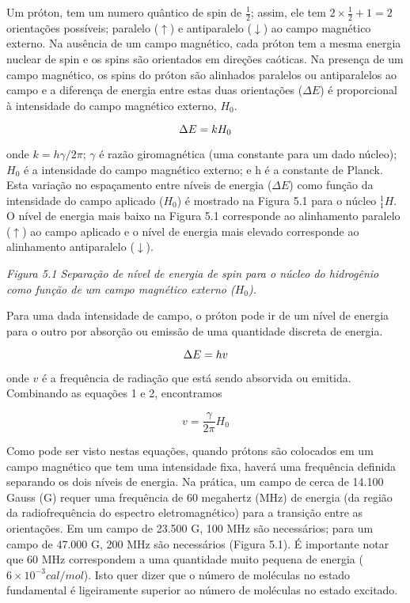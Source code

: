 Um próton,  tem um numero quântico de spin de $\frac{1}{2}$; assim, ele tem $2\times\frac{1}{2}+1=2$ orientações possíveis; paralelo ($\uparrow$) e antiparalelo ($\downarrow$) ao campo magnético externo. Na ausência de um campo magnético, cada próton tem a mesma energia nuclear de spin e os spins são orientados em direções caóticas. Na presença de um campo magnético, os spins do próton são alinhados paralelos ou antiparalelos ao campo e a diferença de energia entre estas duas orientações ($\Delta E$) é proporcional à intensidade do campo magnético externo, $H_0$.

\begin{equation}
    \centering
    \Delta E = k H_0
\end{equation}

\noindent onde $k = h\gamma/2\pi$; $\gamma$ é razão giromagnética (uma constante para um dado núcleo); $H_0$ é a intensidade do campo magnético externo; e h é a constante de Planck. Esta variação no espaçamento entre níveis de energia ($\Delta E$) como função da intensidade do campo aplicado ($H_0$) é mostrado na Figura 5.1 para o núcleo $^1_1H$. O nível de energia mais baixo na Figura 5.1 corresponde ao alinhamento paralelo ($\uparrow$) ao campo aplicado e o nível de energia mais elevado corresponde ao alinhamento antiparalelo ($\downarrow$).

\emph{Figura 5.1 Separação de nível de energia de spin para o núcleo do hidrogênio como função de um campo magnético externo ($H_0$).}

Para uma dada intensidade de campo, o próton pode ir de um nível de energia para o outro por absorção ou emissão de uma quantidade discreta de energia.

\begin{equation}
    \centering
    \Delta E = hv
\end{equation}

onde $v$ é a frequência de radiação que está sendo absorvida ou emitida. Combinando as equações 1 e 2, encontramos

\begin{equation}
v = \frac{\gamma}{2\pi} H_0
\end{equation}

Como pode ser visto nestas equações, quando prótons são colocados em um campo magnético que tem uma intensidade fixa, haverá uma frequência definida separando os dois níveis de energia. Na prática, um campo de cerca de 14.100 Gauss (G) requer uma frequência de 60 megahertz (MHz) de energia (da região da radiofrequência do espectro eletromagnético) para a transição entre as orientações. Em um campo de 23.500 G, 100 MHz são necessários; para um campo de 47.000 G, 200 MHz são necessários (Figura 5.1). É importante notar que 60 MHz correspondem a uma quantidade muito pequena de energia ($6\times10^{-3} cal/mol$). Isto quer dizer que o número de moléculas no estado fundamental é ligeiramente superior ao número de moléculas no estado excitado.

